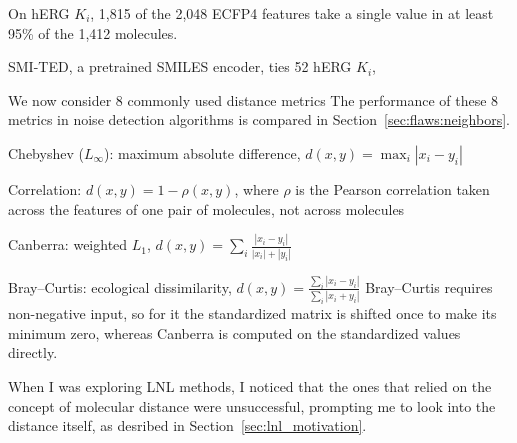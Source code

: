 
On hERG $K_i$, 1,815 of the 2,048 ECFP4 features take a single value in at least 95\% of the 1,412 molecules.


SMI-TED, a pretrained SMILES encoder, ties 52 hERG $K_i$,

We now consider 8 commonly used distance metrics
The performance of these 8 metrics in noise detection algorithms is compared in Section~\ref{sec:flaws:neighbors}.
    \item Chebyshev ($L_\infty$): maximum absolute difference, $d(x, y) = \max_i |x_i - y_i|$
    \item Correlation: $d(x, y) = 1 - \rho(x, y)$, where $\rho$ is the Pearson correlation taken across the features of one pair of molecules, not across molecules
    \item Canberra: weighted $L_1$, $d(x, y) = \sum_i \frac{|x_i - y_i|}{|x_i| + |y_i|}$
    \item Bray--Curtis: ecological dissimilarity, $d(x, y) = \frac{\sum_i |x_i - y_i|}{\sum_i |x_i + y_i|}$ \citep{BrayCurtis1957}
Bray--Curtis requires non-negative input, so for it the standardized matrix is shifted once to make its minimum zero, whereas Canberra is computed on the standardized values directly.

When I was exploring LNL methods, I noticed that the ones that relied on the concept of molecular distance were unsuccessful, prompting me to look into the distance itself, as desribed in  Section~\ref{sec:lnl_motivation}.

